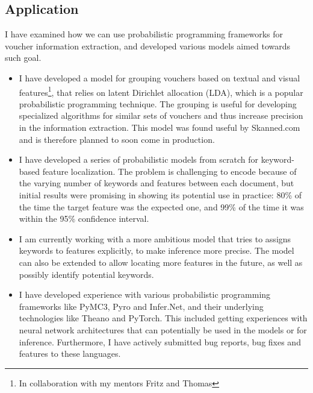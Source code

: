 \documentclass[12pt,a4paper]{article}
\begin{document}
\subsection{Application} I have examined how we can
use probabilistic programming frameworks for voucher information extraction, and
developed various models aimed towards such goal.
\begin{itemize}
\item I have developed a model for grouping vouchers based on textual and visual
  features\footnote{In collaboration with my mentors Fritz and Thomas},
  that relies on latent Dirichlet allocation (LDA), which is a popular
  probabilistic programming technique. The grouping is useful for developing
  specialized algorithms for similar sets of vouchers and thus increase
  precision in the information extraction. This model was found useful by
  Skanned.com and is therefore planned to soon come in production.
\item I have developed a series of probabilistic models from scratch for
  keyword-based feature localization. The problem is challenging to encode
  because of the varying number of keywords and features between each document,
  but initial results were promising in showing its potential use in practice:
  80\% of the time the target feature was the expected one, and 99\% of the time
  it was within the 95\% confidence interval.
\item I am currently working with a more ambitious model that tries to assigns
  keywords to features explicitly, to make inference more precise. The model can
  also be extended to allow locating more features in the future, as well as possibly identify potential
  keywords.
\item I have developed experience with various probabilistic programming
  frameworks like PyMC3, Pyro and Infer.Net, and their underlying technologies
  like Theano and PyTorch. This included getting experiences with neural network
  architectures that can potentially be used in the models or for inference.
  Furthermore, I have actively submitted bug reports, bug fixes and features to
  these languages.
\end{itemize}
\end{document}
